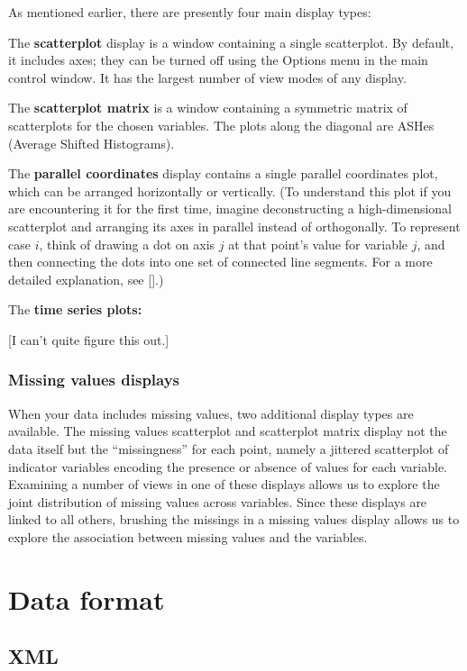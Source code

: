 \documentclass[11pt]{article}
\begin{document}
As mentioned earlier, there are presently four main display types:

The {\bf scatterplot} display is a window containing a single scatterplot.
By default, it includes axes; they can be turned off using the Options
menu in the main control window.  It has the largest number of view
modes of any display.

The {\bf scatterplot matrix} is a window containing a symmetric matrix
of scatterplots for the chosen variables.  The plots along the diagonal
are ASHes (Average Shifted Histograms).

The {\bf parallel coordinates} display contains a single parallel
coordinates plot, which can be arranged horizontally or vertically.
(To understand this plot if you are encountering it for the first time, 
imagine deconstructing a high-dimensional scatterplot and arranging
its axes in parallel instead of orthogonally.  To represent case $i$,
think of drawing a dot on axis $j$ at that point's value for variable
$j$, and then connecting the dots into one set of connected line segments.
For a more detailed explanation, see [].)

The {\bf time series plots:}

[I can't quite figure this out.]

\subsubsection{Missing values displays}

When your data includes missing values, two additional display types
are available.  The missing values scatterplot and scatterplot matrix
display not the data itself but the ``missingness'' for each point, namely
a jittered scatterplot of indicator variables encoding the presence or
absence of values for each variable.  Examining a number of views in one
of these displays allows us to explore the joint distribution of missing
values across variables.  Since these displays are linked to all others,
brushing the missings in a missing values display allows us to explore
the association between missing values and the variables.

\section{Data format}
\label{slbl:DataFormat}
\subsection {XML}
\label{slbl:XML}
\end{document}
